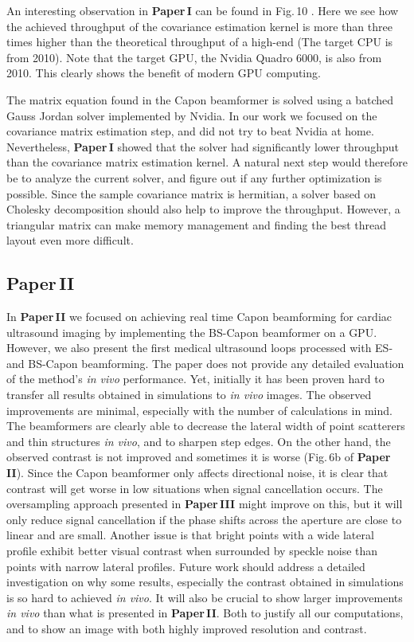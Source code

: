 An interesting observation in \textbf{Paper\,I} can be found in Fig.\,10 . Here we see how the achieved throughput of the covariance estimation kernel is more than three times higher than the theoretical throughput of a high-end  (The target CPU is from 2010). Note that the target GPU, the Nvidia Quadro 6000, is also from 2010. This clearly shows the benefit of modern GPU computing.

The matrix equation found in the Capon beamformer is solved using a batched Gauss Jordan solver implemented by Nvidia. In our work we focused on the covariance matrix estimation step, and did not try to beat Nvidia at home. Nevertheless, \textbf{Paper\,I} showed that the solver had significantly lower throughput than the covariance matrix estimation kernel. A natural next step would therefore be to analyze the current solver, and figure out if any further optimization is possible. Since the sample covariance matrix is hermitian, a solver based on Cholesky decomposition should also help to improve the throughput. However, a triangular matrix can make memory management and finding the best thread layout even more difficult. 

\subsection{Paper\,II}
In \textbf{Paper\,II} we focused on achieving real time Capon beamforming for cardiac ultrasound imaging by implementing the BS-Capon beamformer on a GPU. However, we also present the first medical ultrasound loops processed with ES- and BS-Capon beamforming.  The paper does not provide any detailed evaluation of the method's \textit{in vivo} performance. Yet, initially it has been proven hard to transfer all results obtained in simulations to \textit{in vivo} images. The observed improvements are minimal, especially with the number of calculations in mind. The beamformers are clearly able to decrease the lateral width of point scatterers and thin structures \textit{in vivo}, and to sharpen step edges. On the other hand, the observed contrast is not improved and sometimes it is worse (Fig.\,6b of \textbf{Paper\,II}). Since the Capon beamformer only affects directional noise, it is clear that contrast will get worse in low  situations when signal cancellation occurs. The oversampling approach presented in \textbf{Paper\,III} might improve on this, but it will only reduce signal cancellation if the phase shifts across the aperture are close to linear and are small. Another issue is that bright points with a wide lateral profile exhibit better visual contrast when surrounded by speckle noise than points with narrow lateral profiles. Future work should address a detailed investigation on why some results, especially the contrast obtained in simulations is so hard to achieved \textit{in vivo}. It will also be crucial to show larger improvements \textit{in vivo} than what is presented in \textbf{Paper\,II}. Both to justify all our computations, and to show an image with both highly improved resolution and contrast. 

